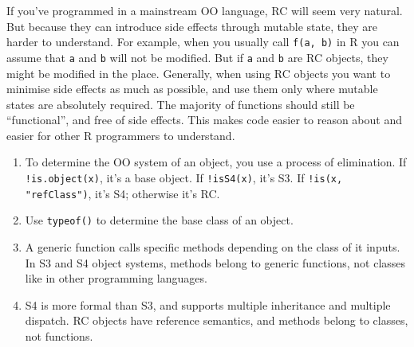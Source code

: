 If you've programmed in a mainstream OO language, RC will seem very
natural. But because they can introduce side effects through mutable
state, they are harder to understand. For example, when you usually call
\texttt{f(a, b)} in R you can assume that \texttt{a} and \texttt{b} will
not be modified. But if \texttt{a} and \texttt{b} are RC objects, they
might be modified in the place. Generally, when using RC objects you
want to minimise side effects as much as possible, and use them only
where mutable states are absolutely required. The majority of functions
should still be ``functional'', and free of side effects. This makes
code easier to reason about and easier for other R programmers to
understand.


\begin{enumerate}
\def\labelenumi{\arabic{enumi}.}
\item
  To determine the OO system of an object, you use a process of
  elimination. If \texttt{!is.object(x)}, it's a base object. If
  \texttt{!isS4(x)}, it's S3. If \texttt{!is(x, "refClass")}, it's S4;
  otherwise it's RC.
\item
  Use \texttt{typeof()} to determine the base class of an object.
\item
  A generic function calls specific methods depending on the class of it
  inputs. In S3 and S4 object systems, methods belong to generic
  functions, not classes like in other programming languages.
\item
  S4 is more formal than S3, and supports multiple inheritance and
  multiple dispatch. RC objects have reference semantics, and methods
  belong to classes, not functions.
\end{enumerate}
